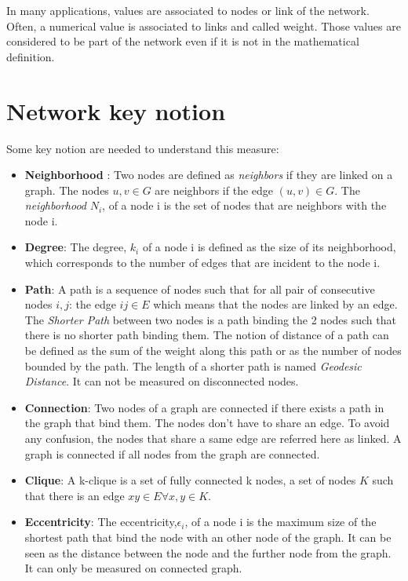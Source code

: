 \documentclass[a4paper, 12pt]{report}
\begin{document}
In many applications, values are associated to nodes or link of the network. Often, a numerical value is associated to links and called weight. Those values are considered to be part of the network even if it is not in the mathematical definition. 


\section{Network key notion}

Some key notion are needed to understand this measure:
\begin{itemize}
\item \textbf{Neighborhood} : Two nodes are defined as \textit{neighbors} if they are linked on a graph. The nodes $u,v \in G$ are neighbors if the edge $(u,v) \in G$. The \textit{neighborhood} $N_i$, of a node i is the set of nodes that are neighbors with the node i.

\item \textbf{Degree}: The degree, $k_i$ of a node i is defined as the size of its neighborhood, which corresponds to the number of edges that are incident to the node i.


\item \textbf{Path}: A path is a sequence of nodes such that for all pair of consecutive nodes $i,j$: the edge $ij \in E$ which means that the nodes are linked by an edge. The \textit{Shorter Path} between two nodes is a path binding the 2 nodes such that there is no shorter path binding them. The notion of distance of a path can be defined as the sum of the weight along this path or as the number of nodes bounded by the path. The length of a shorter path is named \textit{Geodesic Distance}. It can not be measured on disconnected nodes.

\item \textbf{Connection}: Two nodes of a graph are connected if there exists a path in the graph that bind them. The nodes don't have to share an edge. To avoid any confusion, the nodes that share a same edge are referred here as linked. A graph is connected if all nodes from the graph are connected.

\item \textbf{Clique}: A k-clique is a set of fully connected k nodes, a set of nodes $K$ such that there is an edge $xy \in E \forall x,y \in K $. 

\item \textbf{Eccentricity}:  The eccentricity,$\epsilon_i$, of a node i is the maximum size of the shortest path that bind the node with an other node of the graph. It can be seen as the distance between the node and the further node from the graph. It  can only be measured on connected graph.

\end{itemize}	
\citep{diestel}
\end{document}

